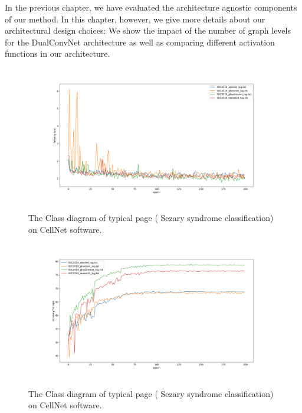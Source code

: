 In the previous chapter, we have evaluated the architecture agnostic components of our
method. In this chapter, however, we give more details about our architectural design
choices: We show the impact of the number of graph levels for the DualConvNet architecture as well as comparing different activation functions in our architecture.



\begin{figure}[t]
\includegraphics[height=0.4\textheight,width=1\textwidth]{thesis-template-master/images/loss_train.png}
\label{fig:cellnet}
\caption{ The Class diagram of typical page ( Sezary syndrome classification) on CellNet software.}
\end{figure}

\begin{figure}[t]
\includegraphics[height=0.4\textheight,width=1\textwidth]{thesis-template-master/images/top1acc.png}
\label{fig:cellnet}
\caption{ The Class diagram of typical page ( Sezary syndrome classification) on CellNet software.}
\end{figure}



